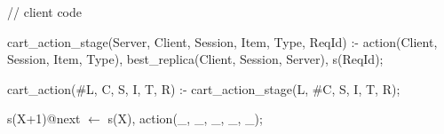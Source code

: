\begin{Dedalus}
// client code

cart_action_stage(Server, Client, Session, Item, Type, ReqId) :-
  action(Client, Session, Item, Type),
  best_replica(Client, Session, Server),
  s(ReqId);

cart_action(#L, C, S, I, T, R) :-
  cart_action_stage(L, #C, S, I, T, R);

s(X+1)@next \(\leftarrow\)  s(X), action(_, _, _, _, _);


\end{Dedalus}